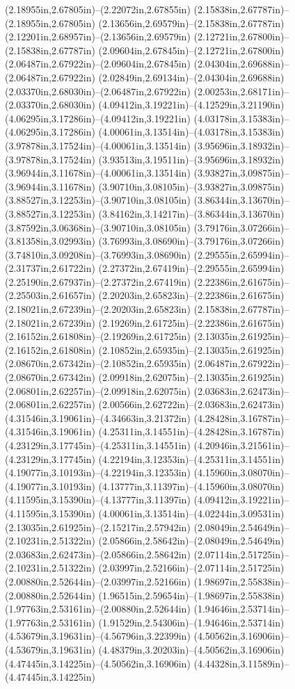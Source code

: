 (2.18955in,2.67805in)--(2.22072in,2.67855in) (2.15838in,2.67787in)--(2.18955in,2.67805in) (2.13656in,2.69579in)--(2.15838in,2.67787in) (2.12201in,2.68957in)--(2.13656in,2.69579in) (2.12721in,2.67800in)--(2.15838in,2.67787in) (2.09604in,2.67845in)--(2.12721in,2.67800in) (2.06487in,2.67922in)--(2.09604in,2.67845in) (2.04304in,2.69688in)--(2.06487in,2.67922in) (2.02849in,2.69134in)--(2.04304in,2.69688in) (2.03370in,2.68030in)--(2.06487in,2.67922in) (2.00253in,2.68171in)--(2.03370in,2.68030in) (4.09412in,3.19221in)--(4.12529in,3.21190in) (4.06295in,3.17286in)--(4.09412in,3.19221in) (4.03178in,3.15383in)--(4.06295in,3.17286in) (4.00061in,3.13514in)--(4.03178in,3.15383in) (3.97878in,3.17524in)--(4.00061in,3.13514in) (3.95696in,3.18932in)--(3.97878in,3.17524in) (3.93513in,3.19511in)--(3.95696in,3.18932in) (3.96944in,3.11678in)--(4.00061in,3.13514in) (3.93827in,3.09875in)--(3.96944in,3.11678in) (3.90710in,3.08105in)--(3.93827in,3.09875in) (3.88527in,3.12253in)--(3.90710in,3.08105in) (3.86344in,3.13670in)--(3.88527in,3.12253in) (3.84162in,3.14217in)--(3.86344in,3.13670in) (3.87592in,3.06368in)--(3.90710in,3.08105in) (3.79176in,3.07266in)--(3.81358in,3.02993in) (3.76993in,3.08690in)--(3.79176in,3.07266in) (3.74810in,3.09208in)--(3.76993in,3.08690in) (2.29555in,2.65994in)--(2.31737in,2.61722in) (2.27372in,2.67419in)--(2.29555in,2.65994in) (2.25190in,2.67937in)--(2.27372in,2.67419in) (2.22386in,2.61675in)--(2.25503in,2.61657in) (2.20203in,2.65823in)--(2.22386in,2.61675in) (2.18021in,2.67239in)--(2.20203in,2.65823in) (2.15838in,2.67787in)--(2.18021in,2.67239in) (2.19269in,2.61725in)--(2.22386in,2.61675in) (2.16152in,2.61808in)--(2.19269in,2.61725in) (2.13035in,2.61925in)--(2.16152in,2.61808in) (2.10852in,2.65935in)--(2.13035in,2.61925in) (2.08670in,2.67342in)--(2.10852in,2.65935in) (2.06487in,2.67922in)--(2.08670in,2.67342in) (2.09918in,2.62075in)--(2.13035in,2.61925in) (2.06801in,2.62257in)--(2.09918in,2.62075in) (2.03683in,2.62473in)--(2.06801in,2.62257in) (2.00566in,2.62722in)--(2.03683in,2.62473in) (4.31546in,3.19061in)--(4.34663in,3.21372in) (4.28428in,3.16787in)--(4.31546in,3.19061in) (4.25311in,3.14551in)--(4.28428in,3.16787in) (4.23129in,3.17745in)--(4.25311in,3.14551in) (4.20946in,3.21561in)--(4.23129in,3.17745in) (4.22194in,3.12353in)--(4.25311in,3.14551in) (4.19077in,3.10193in)--(4.22194in,3.12353in) (4.15960in,3.08070in)--(4.19077in,3.10193in) (4.13777in,3.11397in)--(4.15960in,3.08070in) (4.11595in,3.15390in)--(4.13777in,3.11397in) (4.09412in,3.19221in)--(4.11595in,3.15390in) (4.00061in,3.13514in)--(4.02244in,3.09531in) (2.13035in,2.61925in)--(2.15217in,2.57942in) (2.08049in,2.54649in)--(2.10231in,2.51322in) (2.05866in,2.58642in)--(2.08049in,2.54649in) (2.03683in,2.62473in)--(2.05866in,2.58642in) (2.07114in,2.51725in)--(2.10231in,2.51322in) (2.03997in,2.52166in)--(2.07114in,2.51725in) (2.00880in,2.52644in)--(2.03997in,2.52166in) (1.98697in,2.55838in)--(2.00880in,2.52644in) (1.96515in,2.59654in)--(1.98697in,2.55838in) (1.97763in,2.53161in)--(2.00880in,2.52644in) (1.94646in,2.53714in)--(1.97763in,2.53161in) (1.91529in,2.54306in)--(1.94646in,2.53714in) (4.53679in,3.19631in)--(4.56796in,3.22399in) (4.50562in,3.16906in)--(4.53679in,3.19631in) (4.48379in,3.20203in)--(4.50562in,3.16906in) (4.47445in,3.14225in)--(4.50562in,3.16906in) (4.44328in,3.11589in)--(4.47445in,3.14225in) 